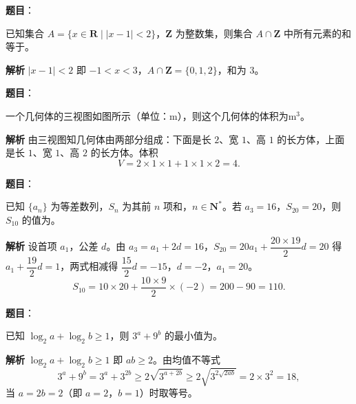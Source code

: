 \begin{answer}

\textbf{题目}：

已知集合 $A=\{x\in\mathbf R\mid |x-1|<2\}$，$\mathbf Z$ 为整数集，则集合 $A\cap\mathbf Z$ 中所有元素的和等于\gkblank{}。

\textbf{解析}
$|x-1|<2$ 即 $-1<x<3$，$A\cap\mathbf Z=\{0,1,2\}$，和为 $3$。


\end{answer}
\begin{answer}

\textbf{题目}：

一个几何体的三视图如图所示（单位：$\mathrm m$），则这个几何体的体积为\gkblank{}$\mathrm m^3$。
\nopagebreak[4]
\begin{center}\end{center}
\nopagebreak[4]
\textbf{解析}
由三视图知几何体由两部分组成：下面是长 $2$、宽 $1$、高 $1$ 的长方体，上面是长 $1$、宽 $1$、高 $2$ 的长方体。体积
\nopagebreak[4]
\[V=2\times1\times1+1\times1\times2=4.\]


\end{answer}
\begin{answer}

\textbf{题目}：

已知 $\{a_n\}$ 为等差数列，$S_n$ 为其前 $n$ 项和，$n\in\mathbf N^*$。若 $a_3=16$，$S_{20}=20$，则 $S_{10}$ 的值为\gkblank{}。

\textbf{解析}
设首项 $a_1$，公差 $d$。由 $a_3=a_1+2d=16$，$S_{20}=20a_1+\dfrac{20\times19}2d=20$ 得 $a_1+\dfrac{19}2d=1$，两式相减得 $\dfrac{15}2d=-15$，$d=-2$，$a_1=20$。
\nopagebreak[4]
\[S_{10}=10\times20+\frac{10\times9}2\times(-2)=200-90=110.\]


\end{answer}
\begin{answer}

\textbf{题目}：

已知 $\log_2a+\log_2b\geqslant1$，则 $3^a+9^b$ 的最小值为\gkblank{}。

\textbf{解析}
$\log_2a+\log_2b\geqslant1$ 即 $ab\geqslant2$。由均值不等式
\nopagebreak[4]
\[3^a+9^b=3^a+3^{2b}\geqslant2\sqrt{3^{a+2b}}\geqslant2\sqrt{3^{2\sqrt{2ab}}}=2\times3^{2}=18,\]
当 $a=2b=2$（即 $a=2$，$b=1$）时取等号。


\end{answer}

